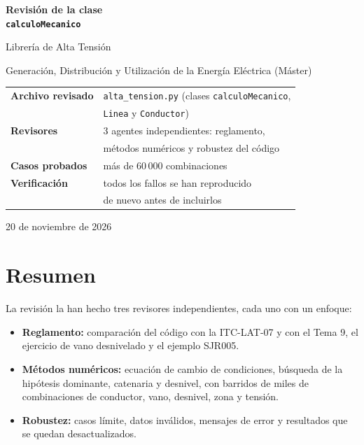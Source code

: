 \documentclass[11pt,a4paper]{article}
\newcommand{\code}[1]{\texttt{#1}}
\begin{document}
\begin{titlepage}
\centering
\vspace*{3cm}
{\Huge\bfseries\color{titulo} Revisión de la clase\\[0.3em] \code{calculoMecanico}\par}
\vspace{1cm}
{\Large Librería de Alta Tensión\par}
\vspace{0.4cm}
{\large Generación, Distribución y Utilización de la Energía Eléctrica (Máster)\par}
\vspace{2.5cm}
\begin{tcolorbox}[colback=fondo, colframe=titulo, width=0.85\textwidth]
\centering
\begin{tabular}{ll}
\textbf{Archivo revisado} & \code{alta\_tension.py} (clases \code{calculoMecanico},\\
                          & \code{Linea} y \code{Conductor})\\[0.3em]
\textbf{Revisores}        & 3 agentes independientes: reglamento,\\
                          & métodos numéricos y robustez del código\\[0.3em]
\textbf{Casos probados}   & más de 60\,000 combinaciones\\[0.3em]
\textbf{Verificación}     & todos los fallos se han reproducido\\
                          & de nuevo antes de incluirlos
\end{tabular}
\end{tcolorbox}
\vfill
{\large 20 de noviembre de 2026\par}
\end{titlepage}

\tableofcontents
\newpage

\section{Resumen}

La revisión la han hecho tres revisores independientes, cada uno con un enfoque:

\begin{itemize}[leftmargin=1.5em]
  \item \textbf{Reglamento:} comparación del código con la ITC-LAT-07 y con el Tema 9, el ejercicio de vano desnivelado y el ejemplo SJR005.
  \item \textbf{Métodos numéricos:} ecuación de cambio de condiciones, búsqueda de la hipótesis dominante, catenaria y desnivel, con barridos de miles de combinaciones de conductor, vano, desnivel, zona y tensión.
  \item \textbf{Robustez:} casos límite, datos inválidos, mensajes de error y resultados que se quedan desactualizados.
\end{itemize}
\end{document}
